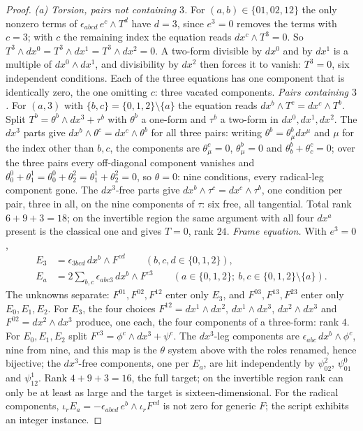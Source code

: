 \documentclass[11pt]{article}
\theoremstyle{definition}
\theoremstyle{plain}
\begin{document}
\begin{proof}
\emph{(a) Torsion, pairs not containing $3$.} For $(a,b) \in \{01, 02, 12\}$ the only nonzero terms of $\epsilon_{abcd}\,e^c\wedge T^d$ have $d = 3$, since $e^3 = 0$ removes the terms with $c = 3$; with $c$ the remaining index the equation reads $dx^c\wedge T^3 = 0$. So $T^3\wedge dx^0 = T^3\wedge dx^1 = T^3\wedge dx^2 = 0$. A two-form divisible by $dx^0$ and by $dx^1$ is a multiple of $dx^0\wedge dx^1$, and divisibility by $dx^2$ then forces it to vanish: $T^3 = 0$, six independent conditions. Each of the three equations has one component that is identically zero, the one omitting $c$: three vacated components. \emph{Pairs containing $3$.} For $(a, 3)$ with $\{b, c\} = \{0,1,2\}\setminus\{a\}$ the equation reads $dx^b\wedge T^c = dx^c\wedge T^b$. Split $T^b = \theta^b\wedge dx^3 + \tau^b$ with $\theta^b$ a one-form and $\tau^b$ a two-form in $dx^0, dx^1, dx^2$. The $dx^3$ parts give $dx^b\wedge\theta^c = dx^c\wedge\theta^b$ for all three pairs: writing $\theta^b = \theta^b_\mu dx^\mu$ and $\mu$ for the index other than $b, c$, the components are $\theta^c_\mu = 0$, $\theta^b_\mu = 0$ and $\theta^b_b + \theta^c_c = 0$; over the three pairs every off-diagonal component vanishes and $\theta^0_0 + \theta^1_1 = \theta^0_0 + \theta^2_2 = \theta^1_1 + \theta^2_2 = 0$, so $\theta = 0$: nine conditions, every radical-leg component gone. The $dx^3$-free parts give $dx^b\wedge\tau^c = dx^c\wedge\tau^b$, one condition per pair, three in all, on the nine components of $\tau$: six free, all tangential. Total rank $6 + 9 + 3 = 18$; on the invertible region the same argument with all four $dx^a$ present is the classical one and gives $T = 0$, rank $24$. \emph{Frame equation.} With $e^3 = 0$,
\[
\begin{aligned}
E_3 &= \epsilon_{3bcd}\,dx^b\wedge F^{cd} \qquad (b,c,d \in \{0,1,2\}),\\
E_a &= 2\sum_{b,c}\epsilon_{abc3}\,dx^b\wedge F^{c3} \qquad (a \in \{0,1,2\};\ b, c \in \{0,1,2\}\setminus\{a\}).
\end{aligned}
\]
The unknowns separate: $F^{01}, F^{02}, F^{12}$ enter only $E_3$, and $F^{03}, F^{13}, F^{23}$ enter only $E_0, E_1, E_2$. For $E_3$, the four choices $F^{12} = dx^1\wedge dx^2$, $dx^1\wedge dx^3$, $dx^2\wedge dx^3$ and $F^{02} = dx^2\wedge dx^3$ produce, one each, the four components of a three-form: rank $4$. For $E_0, E_1, E_2$ split $F^{c3} = \phi^c\wedge dx^3 + \psi^c$. The $dx^3$-leg components are $\epsilon_{abc}\,dx^b\wedge\phi^c$, nine from nine, and this map is the $\theta$ system above with the roles renamed, hence bijective; the $dx^3$-free components, one per $E_a$, are hit independently by $\psi^2_{02}$, $\psi^0_{01}$ and $\psi^1_{12}$. Rank $4 + 9 + 3 = 16$, the full target; on the invertible region rank can only be at least as large and the target is sixteen-dimensional. For the radical components, $\iota_r E_a = -\epsilon_{abcd}\,e^b\wedge\iota_r F^{cd}$ is not zero for generic $F$; the script exhibits an integer instance.


\end{proof}
\end{document}
